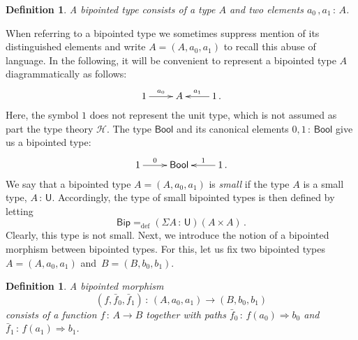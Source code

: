\documentclass[10pt,a4paper,oneside,reqno]{amsart}
\theoremstyle{mythm}
\theoremstyle{mydef}
\newtheorem{definition}[theorem]{Definition}
\theoremstyle{myrmk}
\newcommand{\ie}{\text{i.e.\ }}
\newcommand{\defeq}{=_{\mathrm{def}}}
\newcommand{\co}{\,{:}\,}
\newcommand{\Hint}{\mathcal{H}}
\newcommand{\Bool}{\mathsf{Bool}}
\newcommand{\U}{\mathsf{U}}
\newcommand{\Bip}{\mathsf{Bip}}
\begin{document}
\begin{definition} \label{thm:bipointedtype}
A \emph{bipointed type} consists of a type $A$ 
and two elements  $a_0 \, , a_1 \co A$. 
\end{definition}



When referring to a bipointed type we sometimes suppress mention of its distinguished elements and write $A = (A, a_0, a_1)$ to recall this abuse of language.  In the following, it will be convenient to represent a bipointed type $A$  
diagrammatically as follows:
\[
\xymatrix{
1 \ar[r]^-{a_0}&  A & 1 \ar[l]_-{a_1} \, .}
 \]
Here, the symbol $1$ does not represent the unit type, which is not assumed as part the type theory $\Hint$.
The type $\Bool$ and its canonical elements $0, 1 \co \Bool$ give us a bipointed type:
\[
\xymatrix{
 1 \ar[r]^-{0}&  \Bool  & 1 \ar[l]_-{1} \, . }
 \]
We say that a bipointed type $A = (A, a_0, a_1)$ is \emph{small} if the type $A$ is a small type, \ie $A \co \U$. 
Accordingly, the type of small bipointed types is then defined by letting 
\[
\Bip \defeq (\Sigma A \co \U)( A \times A ) \, .
\]
Clearly,  this type is not small.  Next, we introduce the notion of a bipointed morphism between bipointed types. 
For this, let us fix two bipointed types $A = (A, a_0, a_1)$ and~$B = (B, b_0, b_1)$. 


\begin{definition} A \emph{bipointed morphism} 
\[
(f, \bar{f}_0, \bar{f}_1)  \co (A, a_0, a_1)  \to (B, b_0, b_1)
\] 
consists of a function $f \co A \to B$ together with paths $\bar{f}_0 \co  f(a_0) \Rightarrow b_0$ 
and~$\bar{f}_1 \co f(a_1) \Rightarrow b_1$.  \end{definition}
\end{document}
